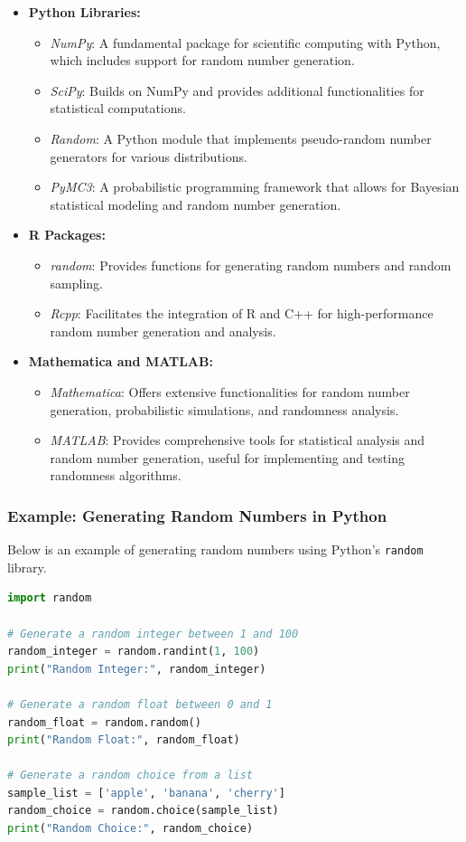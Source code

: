 \documentclass[12pt]{book} %
\begin{document}
\begin{itemize}
    \item \textbf{Python Libraries:}
        \begin{itemize}
            \item \textit{NumPy}: A fundamental package for scientific computing with Python, which includes support for random number generation.
            \item \textit{SciPy}: Builds on NumPy and provides additional functionalities for statistical computations.
            \item \textit{Random}: A Python module that implements pseudo-random number generators for various distributions.
            \item \textit{PyMC3}: A probabilistic programming framework that allows for Bayesian statistical modeling and random number generation.
        \end{itemize}
    \item \textbf{R Packages:}
        \begin{itemize}
            \item \textit{random}: Provides functions for generating random numbers and random sampling.
            \item \textit{Rcpp}: Facilitates the integration of R and C++ for high-performance random number generation and analysis.
        \end{itemize}
    \item \textbf{Mathematica and MATLAB:}
        \begin{itemize}
            \item \textit{Mathematica}: Offers extensive functionalities for random number generation, probabilistic simulations, and randomness analysis.
            \item \textit{MATLAB}: Provides comprehensive tools for statistical analysis and random number generation, useful for implementing and testing randomness algorithms.
        \end{itemize}
\end{itemize}

\subsubsection*{Example: Generating Random Numbers in Python}
Below is an example of generating random numbers using Python's \texttt{random} library.

\FloatBarrier
\begin{lstlisting}[language=Python, caption=Generating Random Numbers in Python]
import random

# Generate a random integer between 1 and 100
random_integer = random.randint(1, 100)
print("Random Integer:", random_integer)

# Generate a random float between 0 and 1
random_float = random.random()
print("Random Float:", random_float)

# Generate a random choice from a list
sample_list = ['apple', 'banana', 'cherry']
random_choice = random.choice(sample_list)
print("Random Choice:", random_choice)
\end{lstlisting}
\FloatBarrier
\end{document}
